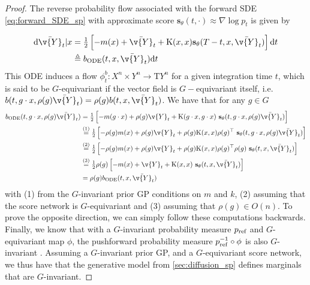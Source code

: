 \begin{proof}
	The reverse probability flow associated with the forward SDE \eqref{eq:forward_SDE_sp} with approximate score $\mathbf{s}_\theta(t, \cdot) \approx \nabla \log p_t$ is given by 

	\begin{align} \label{eq:backward_ODE_sp} \mathrm{d} \bar{\v{Y}}_t|x &= \tfrac{1}{2} \left[-m(x) + \bar{\v{Y}}_t + \mathrm{K}(x,x) \mathbf{s}_\theta(T - t, x, \bar{\v{Y}}_t) \right] \mathrm{d} t \\ & \triangleq b_{\text{ODE}}(t, x, \bar{\v{Y}}_t) \mathrm{d} t \end{align} This ODE induces a flow $\phi^b_t: X^n \times Y^n \rightarrow \mathrm{T}Y^n$ for a given integration time $t$, which is said to be $G$-equivariant if the vector field is $G-$equivariant itself, i.e.\ $b(t, g\cdot x, \rho(g) \bar{\v{Y}}_t) = \rho(g) b(t, x, \bar{\v{Y}}_t)$.
	We have that for any $g \in G$ \begin{align} b_{\text{ODE}}(t, g\cdot x, \rho(g) \bar{\v{Y}}_t) &= \tfrac{1}{2} \left[ -m(g \cdot x) + \rho(g) \v{Y}_t + \mathrm{K}(g \cdot x,g \cdot x) ~\mathbf{s}_\theta(t, g \cdot x, \rho(g) \bar{\v{Y}}_t) \right] \\ &\overset{(1)}{=} \tfrac{1}{2} \left[-\rho(g)m(x) + \rho(g) \v{Y}_t + \rho(g) \mathrm{K}(x,x)\rho(g)^\top ~\mathbf{s}_\theta(t, g \cdot x, \rho(g) \bar{\v{Y}}_t) \right] \\ &\overset{(2)}{=} \tfrac{1}{2} \left[-\rho(g)m(x) + \rho(g) \v{Y}_t + \rho(g) \mathrm{K}(x,x)\rho(g)^\top \rho(g) ~\mathbf{s}_\theta(t, x, \bar{\v{Y}}_t) \right] \\ &\overset{(3)}{=} \tfrac{1}{2} \rho(g) \left[-m(x) + \v{Y}_t + \mathrm{K}(x,x) ~\mathbf{s}_\theta(t, x, \bar{\v{Y}}_t) \right] \\ &\overset{}{=} \rho(g) b_{\text{ODE}}(t, x, \bar{\v{Y}}_t) \end{align} with (1) from the $G$-invariant prior GP conditions on $m$ and $k$, (2) assuming that the score network is $G$-equivariant and (3) assuming that $\rho(g) \in O(n)$.
	To prove the opposite direction, we can simply follow these computations backwards.
	Finally, we know that with a $G$-invariant probability measure $p_{\textup{ref}}$ and $G$-equivariant map $\phi$, the pushforward probability measure $p_{\textup{ref}}^{-1} \circ \phi$ is also $G$-invariant \parencite{kohler2020equivariant,papamakarios2019normalizing}.
	Assuming a $G$-invariant prior GP, and a $G$-equivariant score network, we thus have that the generative model from \cref{sec:diffusion_sp} defines marginals that are $G$-invariant.
\end{proof}

